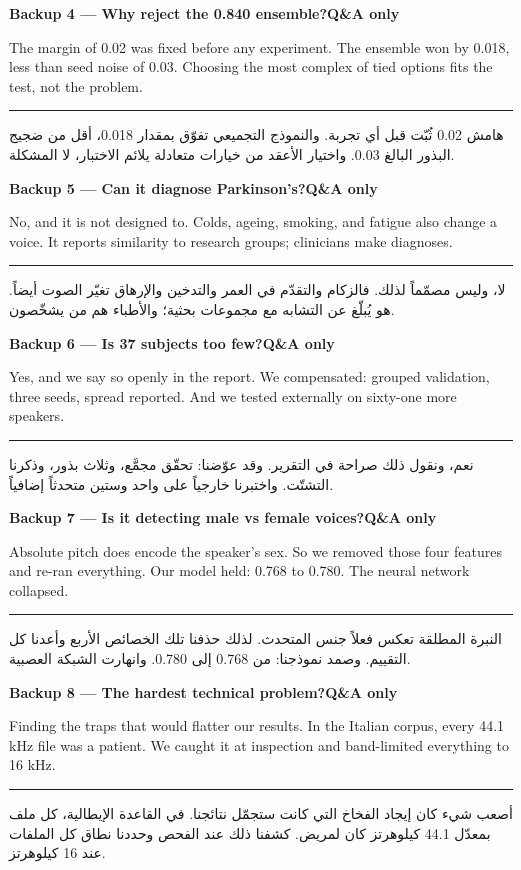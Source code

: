 \documentclass[12pt,a4paper]{article}
\newcommand{\slidehead}[2]{%
\noindent\colorbox{honest!10}{\parbox{\dimexpr\textwidth-2\fboxsep}{%
\textbf{#1}\hfill\textbf{#2}}}\par\vspace{4pt}}
\newcommand{\arstart}{\par\vspace{6pt}\hrule\vspace{6pt}}
\begin{document}
\slidehead{Backup 4 --- Why reject the 0.840 ensemble?}{Q\&A only}
The margin of 0.02 was fixed before any experiment.
The ensemble won by 0.018, less than seed noise of 0.03.
Choosing the most complex of tied options fits the test, not the problem.
\arstart
\begin{Arabic}
هامش \textenglish{0.02} ثُبّت قبل أي تجربة.
والنموذج التجميعي تفوّق بمقدار \textenglish{0.018}، أقل من ضجيج البذور البالغ \textenglish{0.03}.
واختيار الأعقد من خيارات متعادلة يلائم الاختبار، لا المشكلة.
\end{Arabic}
\clearpage

\slidehead{Backup 5 --- Can it diagnose Parkinson's?}{Q\&A only}
No, and it is not designed to.
Colds, ageing, smoking, and fatigue also change a voice.
It reports similarity to research groups; clinicians make diagnoses.
\arstart
\begin{Arabic}
لا، وليس مصمّماً لذلك.
فالزكام والتقدّم في العمر والتدخين والإرهاق تغيّر الصوت أيضاً.
هو يُبلّغ عن التشابه مع مجموعات بحثية؛ والأطباء هم من يشخّصون.
\end{Arabic}
\clearpage

\slidehead{Backup 6 --- Is 37 subjects too few?}{Q\&A only}
Yes, and we say so openly in the report.
We compensated: grouped validation, three seeds, spread reported.
And we tested externally on sixty-one more speakers.
\arstart
\begin{Arabic}
نعم، ونقول ذلك صراحة في التقرير.
وقد عوّضنا: تحقّق مجمَّع، وثلاث بذور، وذكرنا التشتّت.
واختبرنا خارجياً على واحد وستين متحدثاً إضافياً.
\end{Arabic}
\clearpage

\slidehead{Backup 7 --- Is it detecting male vs female voices?}{Q\&A only}
Absolute pitch does encode the speaker's sex.
So we removed those four features and re-ran everything.
Our model held: 0.768 to 0.780. The neural network collapsed.
\arstart
\begin{Arabic}
النبرة المطلقة تعكس فعلاً جنس المتحدث.
لذلك حذفنا تلك الخصائص الأربع وأعدنا كل التقييم.
وصمد نموذجنا: من \textenglish{0.768} إلى \textenglish{0.780}. وانهارت الشبكة العصبية.
\end{Arabic}
\clearpage

\slidehead{Backup 8 --- The hardest technical problem?}{Q\&A only}
Finding the traps that would flatter our results.
In the Italian corpus, every 44.1 kHz file was a patient.
We caught it at inspection and band-limited everything to 16 kHz.
\arstart
\begin{Arabic}
أصعب شيء كان إيجاد الفخاخ التي كانت ستجمّل نتائجنا.
في القاعدة الإيطالية، كل ملف بمعدّل \textenglish{44.1} كيلوهرتز كان لمريض.
كشفنا ذلك عند الفحص وحددنا نطاق كل الملفات عند \textenglish{16} كيلوهرتز.
\end{Arabic}
\end{document}
